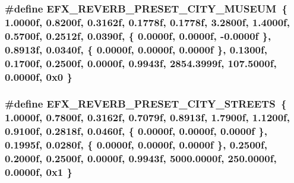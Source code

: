 \subsubsection[{\texorpdfstring{E\+F\+X\+\_\+\+R\+E\+V\+E\+R\+B\+\_\+\+P\+R\+E\+S\+E\+T\+\_\+\+C\+I\+T\+Y\+\_\+\+M\+U\+S\+E\+UM}{EFX_REVERB_PRESET_CITY_MUSEUM}}]{\setlength{\rightskip}{0pt plus 5cm}\#define E\+F\+X\+\_\+\+R\+E\+V\+E\+R\+B\+\_\+\+P\+R\+E\+S\+E\+T\+\_\+\+C\+I\+T\+Y\+\_\+\+M\+U\+S\+E\+UM~\{ 1.\+0000f, 0.\+8200f, 0.\+3162f, 0.\+1778f, 0.\+1778f, 3.\+2800f, 1.\+4000f, 0.\+5700f, 0.\+2512f, 0.\+0390f, \{ 0.\+0000f, 0.\+0000f, -\/0.\+0000f \}, 0.\+8913f, 0.\+0340f, \{ 0.\+0000f, 0.\+0000f, 0.\+0000f \}, 0.\+1300f, 0.\+1700f, 0.\+2500f, 0.\+0000f, 0.\+9943f, 2854.\+3999f, 107.\+5000f, 0.\+0000f, 0x0 \}}\hypertarget{efx-presets_8h_a9c70e815312e934808217c272af2c5d7}{}\label{efx-presets_8h_a9c70e815312e934808217c272af2c5d7}
\subsubsection[{\texorpdfstring{E\+F\+X\+\_\+\+R\+E\+V\+E\+R\+B\+\_\+\+P\+R\+E\+S\+E\+T\+\_\+\+C\+I\+T\+Y\+\_\+\+S\+T\+R\+E\+E\+TS}{EFX_REVERB_PRESET_CITY_STREETS}}]{\setlength{\rightskip}{0pt plus 5cm}\#define E\+F\+X\+\_\+\+R\+E\+V\+E\+R\+B\+\_\+\+P\+R\+E\+S\+E\+T\+\_\+\+C\+I\+T\+Y\+\_\+\+S\+T\+R\+E\+E\+TS~\{ 1.\+0000f, 0.\+7800f, 0.\+3162f, 0.\+7079f, 0.\+8913f, 1.\+7900f, 1.\+1200f, 0.\+9100f, 0.\+2818f, 0.\+0460f, \{ 0.\+0000f, 0.\+0000f, 0.\+0000f \}, 0.\+1995f, 0.\+0280f, \{ 0.\+0000f, 0.\+0000f, 0.\+0000f \}, 0.\+2500f, 0.\+2000f, 0.\+2500f, 0.\+0000f, 0.\+9943f, 5000.\+0000f, 250.\+0000f, 0.\+0000f, 0x1 \}}\hypertarget{efx-presets_8h_ad152b664c7db3b0dd8ab1757bed252af}{}\label{efx-presets_8h_ad152b664c7db3b0dd8ab1757bed252af}
